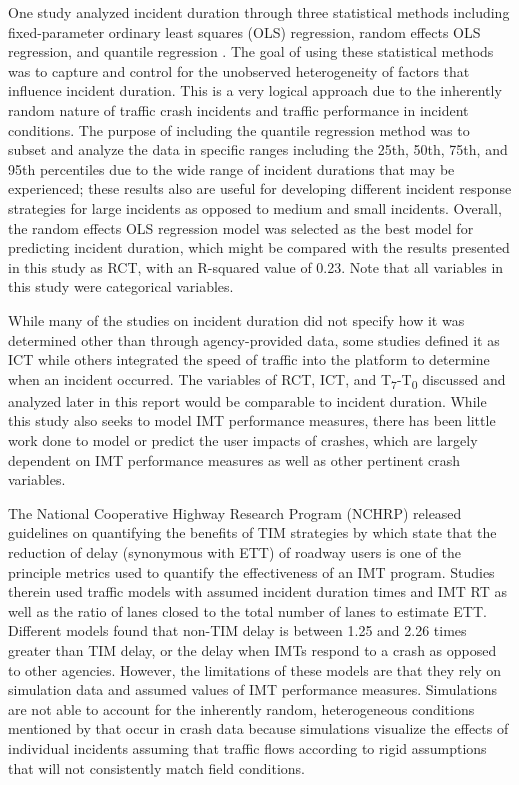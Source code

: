 \documentclass[
  letterpaper,
  authoryear]{elsarticle}
\begin{document}
One study analyzed incident duration through three statistical methods
including fixed-parameter ordinary least squares (OLS) regression,
random effects OLS regression, and quantile regression
\citep{wali_heterogeneity_2022}. The goal of using these statistical
methods was to capture and control for the unobserved heterogeneity of
factors that influence incident duration. This is a very logical
approach due to the inherently random nature of traffic crash incidents
and traffic performance in incident conditions. The purpose of including
the quantile regression method was to subset and analyze the data in
specific ranges including the 25th, 50th, 75th, and 95th percentiles due
to the wide range of incident durations that may be experienced; these
results also are useful for developing different incident response
strategies for large incidents as opposed to medium and small incidents.
Overall, the random effects OLS regression model was selected as the
best model for predicting incident duration, which might be compared
with the results presented in this study as RCT, with an R-squared value
of 0.23. Note that all variables in this study were categorical
variables.

While many of the studies on incident duration did not specify how it
was determined other than through agency-provided data, some studies
defined it as ICT while others integrated the speed of traffic into the
platform to determine when an incident occurred. The variables of RCT,
ICT, and T\textsubscript{7}-T\textsubscript{0} discussed and analyzed
later in this report would be comparable to incident duration. While
this study also seeks to model IMT performance measures, there has been
little work done to model or predict the user impacts of crashes, which
are largely dependent on IMT performance measures as well as other
pertinent crash variables.

The National Cooperative Highway Research Program (NCHRP) released
guidelines on quantifying the benefits of TIM strategies by
\citet{shah_development_2022} which state that the reduction of delay
(synonymous with ETT) of roadway users is one of the principle metrics
used to quantify the effectiveness of an IMT program. Studies therein
used traffic models with assumed incident duration times and IMT RT as
well as the ratio of lanes closed to the total number of lanes to
estimate ETT. Different models found that non-TIM delay is between 1.25
and 2.26 times greater than TIM delay, or the delay when IMTs respond to
a crash as opposed to other agencies. However, the limitations of these
models are that they rely on simulation data and assumed values of IMT
performance measures. Simulations are not able to account for the
inherently random, heterogeneous conditions mentioned by
\citet{wali_heterogeneity_2022} that occur in crash data because
simulations visualize the effects of individual incidents assuming that
traffic flows according to rigid assumptions that will not consistently
match field conditions.
\end{document}
